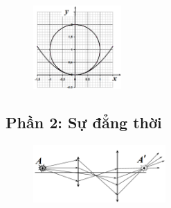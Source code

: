 \begin{figure}[h]
  \centering
  \includegraphics[width=0.3\textwidth]{Figures/P3/Fig 3.2.png}
\end{figure}

\subsection*{Phần 2: Sự đẳng thời}
\begin{figure}
  \centering
  \vspace{-4mm}
  \includegraphics[width=0.45\textwidth]{Figures/P3/Fig 3.3.png}
\end{figure}

